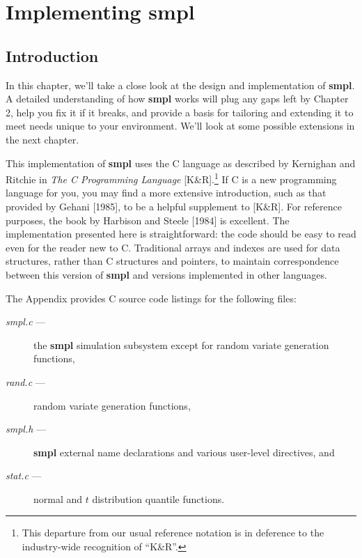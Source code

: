 \chapter{Implementing smpl}
\label{chap:implementing-smpl}

\section{Introduction}

In this chapter, we'll take a close look at the design and implementation
of \textbf{smpl}. A detailed understanding of how \textbf{smpl} works will plug any gaps left
by Chapter 2, help you fix it if it breaks, and provide a basis for tailoring
and extending it to meet needs unique to your environment. We'll look at
some possible extensions in the next chapter.

This implementation of \textbf{smpl} uses the C language as described by
Kernighan and Ritchie in \textit{The C Programming Language} [K\&R].\footnote{This departure from our usual reference notation is in deference to the industry-wide recognition of ``K\&R''.}
If C is a new programming language for you, you may find a more extensive
introduction, such as that provided by Gehani [1985], to be a helpful
supplement to [K\&R]. For reference purposes, the book by Harbison and
Steele [1984] is excellent. The implementation presented here is straightforward:
the code should be easy to read even for the reader new to C.
Traditional arrays and indexes are used for data structures, rather than C
structures and pointers, to maintain correspondence between this version of
\textbf{smpl} and versions implemented in other languages.

The Appendix provides C source code listings for the following files:
\begin{description}
\item[\textit{smpl.c} ---] the \textbf{smpl} simulation subsystem except for random variate generation functions,
\item[\textit{rand.c} ---] random variate generation functions,
\item[\textit{smpl.h} ---] \textbf{smpl} external name declarations and various user-level directives, and
\item[\textit{stat.c} ---] normal and $t$ distribution quantile functions.
\end{description}

